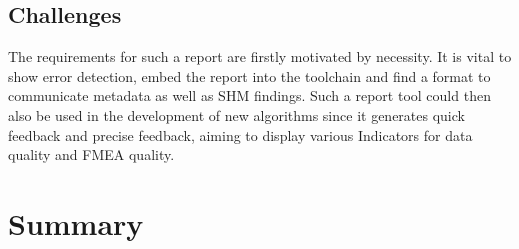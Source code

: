 \subsection{Challenges}

The requirements for such a report are firstly motivated by necessity. It is vital to show error detection, embed the report into the toolchain and find a format to communicate metadata as well as SHM findings. Such a report tool could then also be used in the development of new algorithms since it generates quick feedback and precise feedback, aiming to display various Indicators for data quality and FMEA quality.

\section{Summary}




